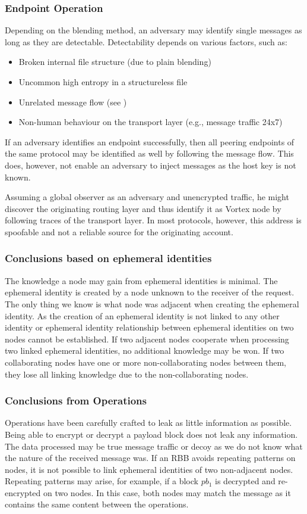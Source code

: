 \documentclass[10pt,journal,compsoc]{IEEEtran}
\begin{document}
\subsubsection{Endpoint Operation}
Depending on the blending method, an adversary may identify single messages as long as they are detectable. Detectability depends on various factors, such as:
\begin{itemize}
	\item Broken internal file structure (due to plain blending)
	\item Uncommon high entropy in a structureless file
	\item Unrelated message flow (see \cite{oakland2013-parrot})
	\item Non-human behaviour on the transport layer (e.g., message traffic 24x7)
\end{itemize}

If an adversary identifies an endpoint successfully, then all peering endpoints of the same protocol may be identified as well by following the message flow. This does, however, not enable an adversary to inject messages as the host key is not known. 

Assuming a global observer as an adversary and unencrypted traffic, he might discover the originating routing layer and thus identify it as Vortex node by following traces of the transport layer. In most protocols, however, this address is spoofable and not a reliable source for the originating account.

\subsubsection{Conclusions based on ephemeral identities}
The knowledge a node may gain from ephemeral identities is minimal. The ephemeral identity is created by a node unknown to the receiver of the request. The only thing we know is what node was adjacent when creating the ephemeral identity. As the creation of an ephemeral identity is not linked to any other identity or ephemeral identity relationship between ephemeral identities on two nodes cannot be established. If two adjacent nodes cooperate when processing two linked ephemeral identities, no additional knowledge may be won. If two collaborating nodes have one or more non-collaborating nodes between them, they lose all linking knowledge due to the non-collaborating nodes. 

\subsubsection{Conclusions from Operations}
Operations have been carefully crafted to leak as little information as possible. Being able to encrypt or decrypt a payload block does not leak any information. The data processed may be true message traffic or decoy as we do not know what the nature of the received message was. If an RBB avoids repeating patterns on nodes, it is not possible to link ephemeral identities of two non-adjacent nodes. Repeating patterns may arise, for example, if a block $pb_1$ is decrypted and re-encrypted on two nodes. In this case, both nodes may match the message as it contains the same content between the operations.
\end{document}
